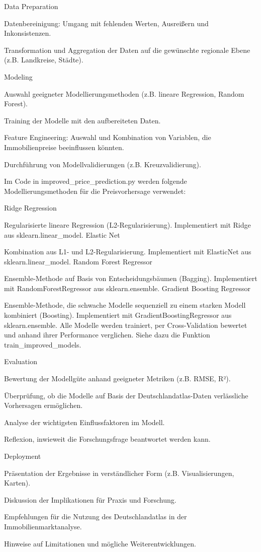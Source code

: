 Data Preparation

    Datenbereinigung: Umgang mit fehlenden Werten, Ausreißern und Inkonsistenzen.

    Transformation und Aggregation der Daten auf die gewünschte regionale Ebene (z.B. Landkreise, Städte).

Modeling

    Auswahl geeigneter Modellierungsmethoden (z.B. lineare Regression, Random Forest).

    Training der Modelle mit den aufbereiteten Daten.

    Feature Engineering: Auswahl und Kombination von Variablen, die Immobilienpreise beeinflussen könnten.

    Durchführung von Modellvalidierungen (z.B. Kreuzvalidierung).

    Im Code in improved_price_prediction.py werden folgende Modellierungsmethoden für die Preisvorhersage verwendet:

Ridge Regression

Regularisierte lineare Regression (L2-Regularisierung).
Implementiert mit Ridge aus sklearn.linear_model.
Elastic Net

Kombination aus L1- und L2-Regularisierung.
Implementiert mit ElasticNet aus sklearn.linear_model.
Random Forest Regressor

Ensemble-Methode auf Basis von Entscheidungsbäumen (Bagging).
Implementiert mit RandomForestRegressor aus sklearn.ensemble.
Gradient Boosting Regressor

Ensemble-Methode, die schwache Modelle sequenziell zu einem starken Modell kombiniert (Boosting).
Implementiert mit GradientBoostingRegressor aus sklearn.ensemble.
Alle Modelle werden trainiert, per Cross-Validation bewertet und anhand ihrer Performance verglichen.
Siehe dazu die Funktion train_improved_models.

Evaluation

    Bewertung der Modellgüte anhand geeigneter Metriken (z.B. RMSE, R²).

    Überprüfung, ob die Modelle auf Basis der Deutschlandatlas-Daten verlässliche Vorhersagen ermöglichen.

    Analyse der wichtigsten Einflussfaktoren im Modell.

    Reflexion, inwieweit die Forschungsfrage beantwortet werden kann.

Deployment

    Präsentation der Ergebnisse in verständlicher Form (z.B. Visualisierungen, Karten).

    Diskussion der Implikationen für Praxis und Forschung.

    Empfehlungen für die Nutzung des Deutschlandatlas in der Immobilienmarktanalyse.

    Hinweise auf Limitationen und mögliche Weiterentwicklungen.
